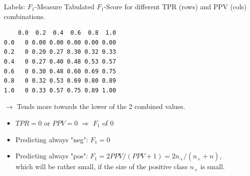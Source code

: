 \documentclass[11pt,compress,t,notes=noshow, xcolor=table]{beamer}
\makeatletter
\newenvironment{kframe}{%
 \def\at@end@of@kframe{}%
 \ifinner\ifhmode%
  \def\at@end@of@kframe{\end{minipage}}%
  \begin{minipage}{\columnwidth}%
 \fi\fi%
 \def\FrameCommand##1{\hskip\@totalleftmargin \hskip-\fboxsep
 \colorbox{shadecolor}{##1}\hskip-\fboxsep
     \hskip-\linewidth \hskip-\@totalleftmargin \hskip\columnwidth}%
 \MakeFramed {\advance\hsize-\width
   \@totalleftmargin\z@ \linewidth\hsize
   \@setminipage}}%
 {\par\unskip\endMakeFramed%
 \at@end@of@kframe}
\newenvironment{knitrout}{}{} %
\makeatother
\begin{document}
\begin{vbframe}{Labels: $F_1$-Measure}
Tabulated $F_1$-Score for different TPR (rows) and PPV (cols) combinations. 
\begin{knitrout}\scriptsize
{}\color{fgcolor}\begin{kframe}
\begin{verbatim}
    0.0  0.2  0.4  0.6  0.8  1.0
0.0   0 0.00 0.00 0.00 0.00 0.00
0.2   0 0.20 0.27 0.30 0.32 0.33
0.4   0 0.27 0.40 0.48 0.53 0.57
0.6   0 0.30 0.48 0.60 0.69 0.75
0.8   0 0.32 0.53 0.69 0.80 0.89
1.0   0 0.33 0.57 0.75 0.89 1.00
\end{verbatim}
\end{kframe}
\end{knitrout}
$\rightarrow$ Tends more towards the lower of the 2 combined values.


\begin{itemize}
  \item $TPR = 0$ or $PPV=0$ $\Rightarrow$ $F_1$ of 0
  \item Predicting always "neg": $F_1 = 0$
  \item Predicting always "pos": $F_1 = 2 PPV / (PPV + 1) = 2 n_+ / (n_+ + n)$,\\ 
  which will be rather small, if the size of the positive class $n_+$ is small.
\end{itemize}


\end{vbframe}

\endlecture
\end{document}
